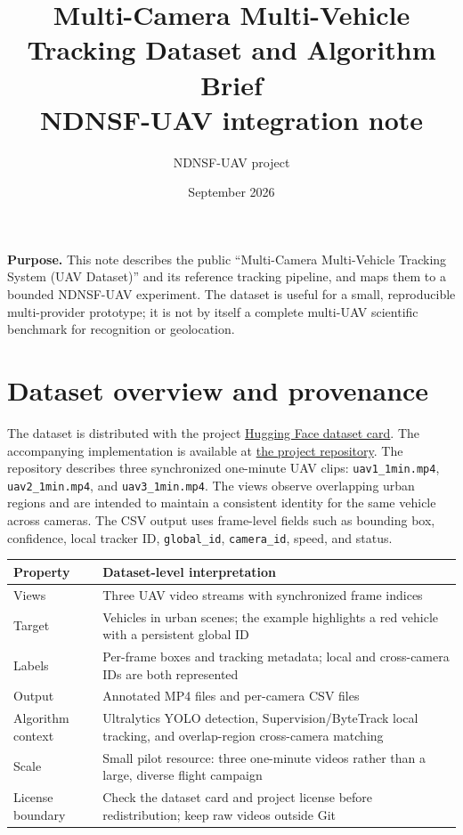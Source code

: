 \documentclass[10pt,a4paper]{article}
\title{\textbf{Multi-Camera Multi-Vehicle Tracking Dataset and Algorithm Brief}\\
\large NDNSF-UAV integration note}
\author{NDNSF-UAV project}
\date{September 2026}
\newcommand{\code}[1]{\texttt{\small #1}}
\begin{document}
\maketitle

\textbf{Purpose.} This note describes the public ``Multi-Camera Multi-Vehicle
Tracking System (UAV Dataset)'' and its reference tracking pipeline, and maps
them to a bounded NDNSF-UAV experiment. The dataset is useful for a small,
reproducible multi-provider prototype; it is not by itself a complete
multi-UAV scientific benchmark for recognition or geolocation.

\section{Dataset overview and provenance}

The dataset is distributed with the project
\href{https://huggingface.co/datasets/jye9/Multi-Camera-Multi-Vehicle-Tracking-System}{Hugging Face dataset card}.
The accompanying implementation is available at
\href{https://github.com/JYe9/multi-camera-multi-vehicle-tracking-system}{the project repository}.
The repository describes three synchronized one-minute UAV clips:
\code{uav1\_1min.mp4}, \code{uav2\_1min.mp4}, and \code{uav3\_1min.mp4}.
The views observe overlapping urban regions and are intended to maintain a
consistent identity for the same vehicle across cameras. The CSV output uses
frame-level fields such as bounding box, confidence, local tracker ID,
\code{global\_id}, \code{camera\_id}, speed, and status.

\begin{table}[h]
\centering
\small
\begin{tabularx}{\linewidth}{@{}lX@{}}
\toprule
Property & Dataset-level interpretation \\
\midrule
Views & Three UAV video streams with synchronized frame indices \\
Target & Vehicles in urban scenes; the example highlights a red vehicle with a persistent global ID \\
Labels & Per-frame boxes and tracking metadata; local and cross-camera IDs are both represented \\
Output & Annotated MP4 files and per-camera CSV files \\
Algorithm context & Ultralytics YOLO detection, Supervision/ByteTrack local tracking, and overlap-region cross-camera matching \\
Scale & Small pilot resource: three one-minute videos rather than a large, diverse flight campaign \\
License boundary & Check the dataset card and project license before redistribution; keep raw videos outside Git \\
\bottomrule
\end{tabularx}
\end{table}
\end{document}
